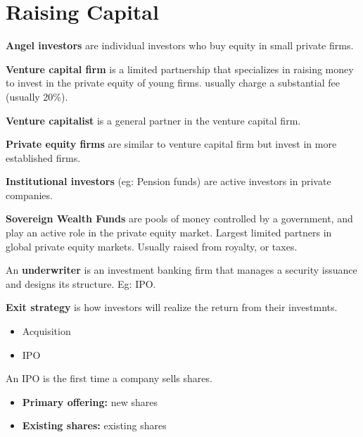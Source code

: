 \documentclass[english, 12pt]{article}
\begin{document}
\section{Raising Capital}
\begin{defn}
\textbf{Angel investors} are individual investors who buy equity in small private firms.
\end{defn}
\begin{defn}
\textbf{Venture capital firm} is a limited partnership that specializes in raising money to invest in the private equity of young firms. usually charge a substantial fee (usually 20\%).
\end{defn}
\begin{defn}
\textbf{Venture capitalist} is a general partner in the venture capital firm.
\end{defn}
\begin{defn}
\textbf{Private equity firms} are similar to venture capital firm but invest in more established firms.
\end{defn}
\begin{defn}
\textbf{Institutional investors} (eg: Pension funds) are active investors in private companies.
\end{defn}
\begin{defn}
\textbf{Sovereign Wealth Funds} are pools of money controlled by a government, and play an active role in the private equity market. Largest limited partners in global private equity markets. Usually raised from royalty, or taxes.
\end{defn}

\begin{defn}
An \textbf{underwriter} is an investment banking firm that manages a security issuance and designs its structure. Eg: IPO.
\end{defn}

\begin{defn}
\textbf{Exit strategy} is how investors will realize the return from their investmnts.
\begin{itemize}
\item Acquisition
\item IPO
\end{itemize}
\end{defn}

\begin{defn}
An IPO is the first time a company sells shares.
\begin{itemize}
\item \textbf{Primary offering:} new shares
\item \textbf{Existing shares:} existing shares
\end{itemize}
\end{defn}
\end{document}
